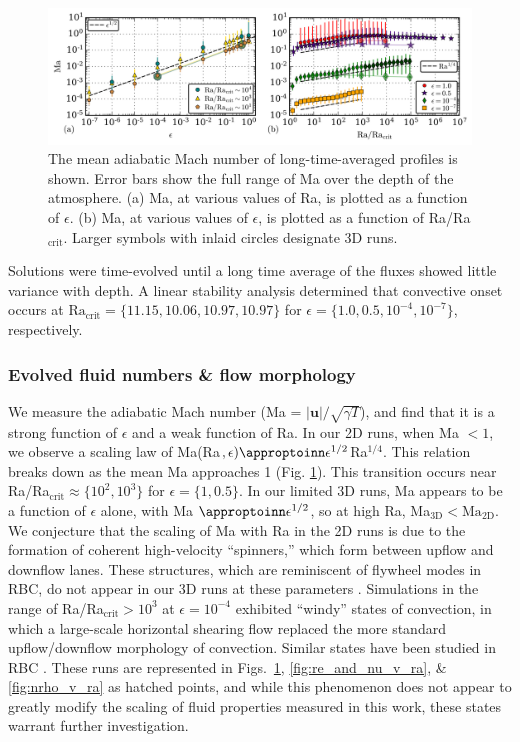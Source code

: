 \begin{figure}[t]
\includegraphics[width=\textwidth]{./figs/ma_v_Ra.pdf}
\caption[Mach number scaling in polytropic solutions.]
{
	The mean adiabatic Mach number of long-time-averaged profiles is shown.  
	Error bars show the full range of Ma over the depth of the atmosphere.
	(a) Ma, at various values of Ra, is plotted as a function of $\epsilon$.
	(b) Ma, at various values of $\epsilon$, is plotted as a function of Ra/Ra$_{\text{crit}}$.
	Larger symbols with inlaid circles designate 3D runs.
	\label{fig:ma_v_eps} 
}
\end{figure}


Solutions were time-evolved until a long time average of the fluxes showed little variance with depth.
A linear stability analysis determined that convective onset occurs at $\text{Ra}_{\text{crit}} = \{11.15, 10.06, 10.97, 10.97\}$ for $\epsilon = \{1.0, 0.5, 10^{-4}, 10^{-7}\}$, respectively.  

\subsubsection{Evolved fluid numbers \& flow morphology}

We measure the adiabatic Mach number (Ma = $|\bm{u}|/\sqrt{\gamma T}$), and find that it is a strong function of $\epsilon$ and a weak function of Ra.  
In our 2D runs, when Ma $< 1$, we observe a scaling law of Ma(Ra$, \epsilon) \appropto \epsilon^{1/2}$Ra$^{1/4}$.
This relation breaks down as the mean Ma approaches 1 (Fig. \ref{fig:ma_v_eps}).  
This transition occurs near Ra/Ra$_\text{crit} \approx \{10^{2}, 10^{3}\}$ for $\epsilon = \{1, 0.5\}$.
In our limited 3D runs, Ma appears to be a function of $\epsilon$ alone, with Ma $\appropto \epsilon^{1/2}$, so at high Ra, Ma$_{\text{3D}} < \text{Ma}_{\text{2D}}$.
We conjecture that the scaling of Ma with Ra in the 2D runs is due to the formation of coherent high-velocity ``spinners,'' which form between upflow and downflow lanes.  
These structures, which are reminiscent of flywheel modes in RBC, do not appear in our 3D runs at these parameters \cite{jones&all1976, brummell&all2002}.
Simulations in the range of Ra/Ra$_{\text{crit}} > 10^3$ at $\epsilon = 10^{-4}$ exhibited ``windy'' states of convection, in which a large-scale horizontal shearing flow replaced the more standard upflow/downflow morphology of convection.  
Similar states have been studied in RBC \cite{goluskin&all2014}.  
These runs are represented in Figs.~\ref{fig:ma_v_eps}, \ref{fig:re_and_nu_v_ra}, \& \ref{fig:nrho_v_ra} as hatched points, and while this phenomenon does not appear to greatly modify the scaling of fluid properties measured in this work, these states warrant further investigation.

